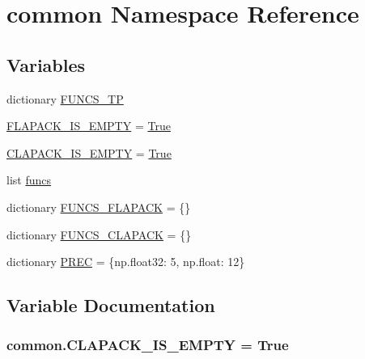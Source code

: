 \hypertarget{namespacecommon}{}\section{common Namespace Reference}
\label{namespacecommon}
\subsection*{Variables}
\begin{DoxyCompactItemize}
\item 
dictionary \hyperlink{namespacecommon_a5ffbc785fdd71516c72c0781cb363dfa}{F\+U\+N\+C\+S\+\_\+\+T\+P}
\item 
\hyperlink{namespacecommon_a86727e0a6204bf433109e992c835145c}{F\+L\+A\+P\+A\+C\+K\+\_\+\+I\+S\+\_\+\+E\+M\+P\+T\+Y} = \hyperlink{libqhull_8h_add3ca9eefe3b5b754426f51d3043e579}{True}
\item 
\hyperlink{namespacecommon_a546d5de0014c639647e6786d6eb8199b}{C\+L\+A\+P\+A\+C\+K\+\_\+\+I\+S\+\_\+\+E\+M\+P\+T\+Y} = \hyperlink{libqhull_8h_add3ca9eefe3b5b754426f51d3043e579}{True}
\item 
list \hyperlink{namespacecommon_a8a91825dd6261030746d71fea14d0dee}{funcs}
\item 
dictionary \hyperlink{namespacecommon_a3de6c4e8a7ab18751c167d9bdd956b15}{F\+U\+N\+C\+S\+\_\+\+F\+L\+A\+P\+A\+C\+K} = \{\}
\item 
dictionary \hyperlink{namespacecommon_a442ede8f273c2db8418c5c40d7f9e7f3}{F\+U\+N\+C\+S\+\_\+\+C\+L\+A\+P\+A\+C\+K} = \{\}
\item 
dictionary \hyperlink{namespacecommon_a6ab9da973403637ef8f58179de21a6f9}{P\+R\+E\+C} = \{np.\+float32\+: 5, np.\+float\+: 12\}
\end{DoxyCompactItemize}


\subsection{Variable Documentation}
\hypertarget{namespacecommon_a546d5de0014c639647e6786d6eb8199b}{}
\subsubsection[{C\+L\+A\+P\+A\+C\+K\+\_\+\+I\+S\+\_\+\+E\+M\+P\+T\+Y}]{\setlength{\rightskip}{0pt plus 5cm}common.\+C\+L\+A\+P\+A\+C\+K\+\_\+\+I\+S\+\_\+\+E\+M\+P\+T\+Y = {\bf True}}\label{namespacecommon_a546d5de0014c639647e6786d6eb8199b}
\hypertarget{namespacecommon_a86727e0a6204bf433109e992c835145c}{}

